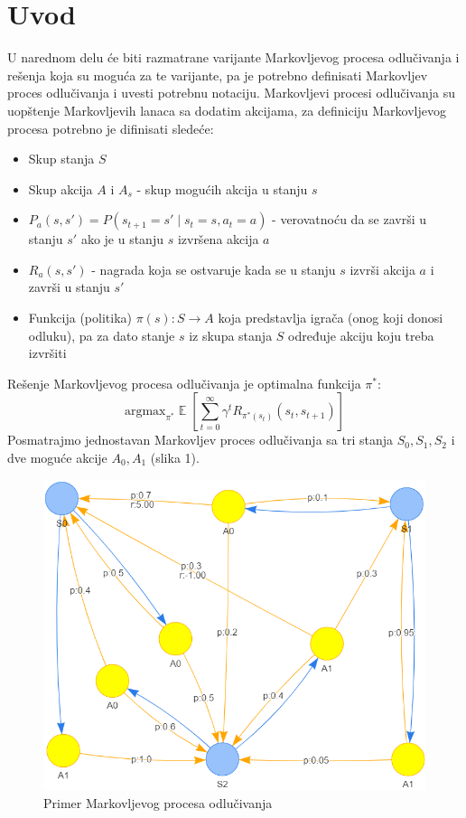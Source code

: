 \documentclass[a4paper,fleqn,12pt]{JMThesis}
\theoremstyle{plain}
\theoremstyle{definition}
\newcommand{\zbtg}{\sum_{t=0}^\infty}
\newcommand{\piopt}{{\pi}^{*}}
\DeclareMathOperator{\EX}{\mathbb{E}}%
\theoremstyle{definition}
\begin{document}
\section[Uvod]{Uvod}
U narednom delu će biti razmatrane varijante Markovljevog procesa odlučivanja i rešenja koja su moguća za te varijante, pa je potrebno definisati Markovljev proces odlučivanja i uvesti potrebnu notaciju.
Markovljevi procesi odlučivanja su uopštenje Markovljevih lanaca sa dodatim akcijama, za definiciju Markovljevog procesa potrebno je difinisati sledeće:
\begin{itemize}
	\item Skup stanja $S$
 	\item Skup akcija $A$ i $A_s$ - skup mogućih akcija u stanju $s$
	\item $P_a(s,s') = P(s_{t+1} = s' \mid s_t = s, a_t = a)$  - verovatnoću da se završi u stanju $s'$ ako je u stanju $s$ izvršena akcija $a$
	\item $R_a(s,s')$ - nagrada koja se ostvaruje kada se u stanju $s$ izvrši akcija $a$ i završi u stanju $s'$
 	\item Funkcija (politika) $\pi(s) : S \rightarrow A$ koja predstavlja igrača (onog koji donosi odluku), pa za dato stanje $s$ iz skupa stanja $S$ određuje akciju koju treba izvršiti 
\end{itemize}
Rešenje Markovljevog procesa odlučivanja je optimalna funkcija $\piopt$:
\[
	\text{argmax}_{\piopt}\EX \left[ \zbtg \gamma^t R_{\piopt(s_t)}(s_t,s_{t+1}) \right]
\]
Posmatrajmo jednostavan Markovljev proces odlučivanja sa tri stanja ${S_0, S_1, S_2}$ i dve moguće akcije ${A_0, A_1}$ (slika 1).
\begin{figure}[!ht]
	\centering
	\includegraphics[scale=0.4]{../graph-visuals/example-mdp.png}
	\caption{Primer Markovljevog procesa odlučivanja}
\end{figure}
\end{document}
